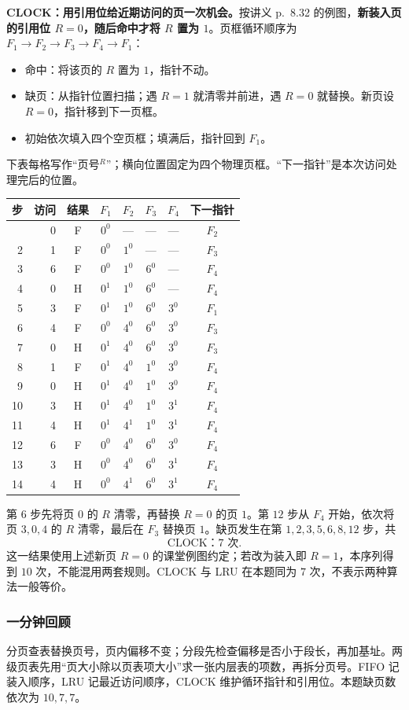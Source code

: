 \begin{checkedsolution}
\textbf{CLOCK：用引用位给近期访问的页一次机会。}按讲义 p.~8.32 的例图，\textbf{新装入页的引用位 $R=0$，随后命中才将 $R$ 置为 $1$}。页框循环顺序为 $F_1\to F_2\to F_3\to F_4\to F_1$：
\begin{itemize}
  \item 命中：将该页的 $R$ 置为 $1$，指针不动。
  \item 缺页：从指针位置扫描；遇 $R=1$ 就清零并前进，遇 $R=0$ 就替换。新页设 $R=0$，指针移到下一页框。
  \item 初始依次填入四个空页框；填满后，指针回到 $F_1$。
\end{itemize}
下表每格写作“页号$^{R}$”；横向位置固定为四个物理页框。“下一指针”是本次访问处理完后的位置。

{\small
\begin{longtable}{@{}rrcccccc@{}}
\toprule
步 & 访问 & 结果 & $F_1$ & $F_2$ & $F_3$ & $F_4$ & 下一指针 \\
\midrule
\endhead
\bottomrule
\endfoot
1  & 0 & F & $0^0$ & ---   & ---   & ---   & $F_2$ \\
2  & 1 & F & $0^0$ & $1^0$ & ---   & ---   & $F_3$ \\
3  & 6 & F & $0^0$ & $1^0$ & $6^0$ & ---   & $F_4$ \\
4  & 0 & H & $0^1$ & $1^0$ & $6^0$ & ---   & $F_4$ \\
5  & 3 & F & $0^1$ & $1^0$ & $6^0$ & $3^0$ & $F_1$ \\
6  & 4 & F & $0^0$ & $4^0$ & $6^0$ & $3^0$ & $F_3$ \\
7  & 0 & H & $0^1$ & $4^0$ & $6^0$ & $3^0$ & $F_3$ \\
8  & 1 & F & $0^1$ & $4^0$ & $1^0$ & $3^0$ & $F_4$ \\
9  & 0 & H & $0^1$ & $4^0$ & $1^0$ & $3^0$ & $F_4$ \\
10 & 3 & H & $0^1$ & $4^0$ & $1^0$ & $3^1$ & $F_4$ \\
11 & 4 & H & $0^1$ & $4^1$ & $1^0$ & $3^1$ & $F_4$ \\
12 & 6 & F & $0^0$ & $4^0$ & $6^0$ & $3^0$ & $F_4$ \\
13 & 3 & H & $0^0$ & $4^0$ & $6^0$ & $3^1$ & $F_4$ \\
14 & 4 & H & $0^0$ & $4^1$ & $6^0$ & $3^1$ & $F_4$ \\
\end{longtable}
}
第 $6$ 步先将页 $0$ 的 $R$ 清零，再替换 $R=0$ 的页 $1$。第 $12$ 步从 $F_4$ 开始，依次将页 $3,0,4$ 的 $R$ 清零，最后在 $F_3$ 替换页 $1$。缺页发生在第 $1,2,3,5,6,8,12$ 步，共
\[
  \boxed{\text{CLOCK：}7\text{ 次}}.
\]
这一结果使用上述新页 $R=0$ 的课堂例图约定；若改为装入即 $R=1$，本序列得到 $10$ 次，不能混用两套规则。CLOCK 与 LRU 在本题同为 $7$ 次，不表示两种算法一般等价。
\end{checkedsolution}

\subsubsection*{一分钟回顾}

分页查表替换页号，页内偏移不变；分段先检查偏移是否小于段长，再加基址。两级页表先用“页大小除以页表项大小”求一张内层表的项数，再拆分页号。FIFO 记装入顺序，LRU 记最近访问顺序，CLOCK 维护循环指针和引用位。本题缺页数依次为 $10,7,7$。

\endgroup
